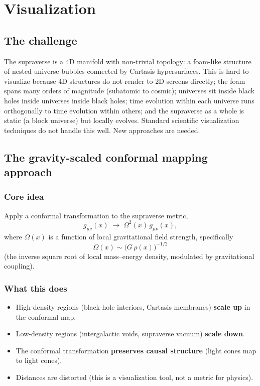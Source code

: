 \chapter{Visualization}
\label{chap:viz}

\section{The challenge}

The supraverse is a 4D manifold with non-trivial topology: a foam-like structure
of nested universe-bubbles connected by Cartasis hypersurfaces. This is hard to
visualize because 4D structures do not render to 2D screens directly; the foam
spans many orders of magnitude (subatomic to cosmic); universes sit inside black
holes inside universes inside black holes; time evolution within each universe
runs orthogonally to time evolution within others; and the supraverse as a whole
is static (a block universe) but locally evolves. Standard scientific
visualization techniques do not handle this well. New approaches are needed.

\section{The gravity-scaled conformal mapping approach}

\subsection{Core idea}

Apply a conformal transformation to the supraverse metric,
\[
  g_{\mu\nu}(x) \;\to\; \Omega^2(x)\, g_{\mu\nu}(x),
\]
where $\Omega(x)$ is a function of local gravitational field strength,
specifically
\[
  \Omega(x) \sim \bigl(G\,\rho(x)\bigr)^{-1/2}
\]
(the inverse square root of local mass--energy density, modulated by
gravitational coupling).

\subsection{What this does}

\begin{itemize}
  \item High-density regions (black-hole interiors, Cartasis membranes)
    \textbf{scale up} in the conformal map.
  \item Low-density regions (intergalactic voids, supraverse vacuum)
    \textbf{scale down}.
  \item The conformal transformation \textbf{preserves causal structure} (light
    cones map to light cones).
  \item Distances are distorted (this is a visualization tool, not a metric for
    physics).
\end{itemize}

